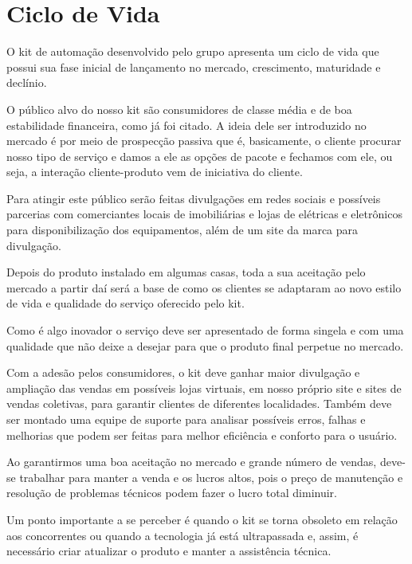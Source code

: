 \chapter{Ciclo de Vida}
\par O kit de automação desenvolvido pelo grupo apresenta um ciclo de vida que possui sua fase inicial de lançamento no mercado, crescimento, maturidade e declínio.


\par O público alvo do nosso kit são consumidores de classe média e de boa estabilidade financeira, como já foi citado. A ideia dele ser introduzido no mercado é por meio de prospecção passiva que é, basicamente, o cliente procurar nosso tipo de serviço e damos a ele as opções de pacote e fechamos com ele, ou seja, a interação cliente-produto vem de iniciativa do cliente.
\par Para atingir este público serão feitas divulgações em redes sociais e possíveis parcerias com comerciantes locais de imobiliárias e lojas de elétricas e eletrônicos para disponibilização dos equipamentos, além de um site da marca para divulgação.
\par Depois do produto instalado em algumas casas, toda a sua aceitação pelo mercado a partir daí será a base de como os clientes se adaptaram ao novo estilo de vida e qualidade do serviço oferecido pelo kit.
\par Como é algo inovador o serviço deve ser apresentado de forma singela e com uma qualidade que não deixe a desejar para que o produto final perpetue no mercado.
\par Com a adesão pelos consumidores, o kit deve ganhar maior divulgação e ampliação das vendas em possíveis lojas virtuais, em nosso próprio site e sites de vendas coletivas, para garantir clientes de diferentes localidades. Também deve ser montado uma equipe de suporte para analisar possíveis erros, falhas e melhorias que podem ser feitas para melhor eficiência e conforto para o usuário.
\par Ao garantirmos uma boa aceitação no mercado e grande número de vendas, deve-se trabalhar para manter a venda e os lucros altos, pois o preço de manutenção e resolução de problemas técnicos podem fazer o lucro total diminuir.
\par Um ponto importante a se perceber é quando o kit se torna obsoleto em relação aos concorrentes ou quando a tecnologia já está ultrapassada e, assim, é necessário criar atualizar o produto e manter a assistência técnica.
